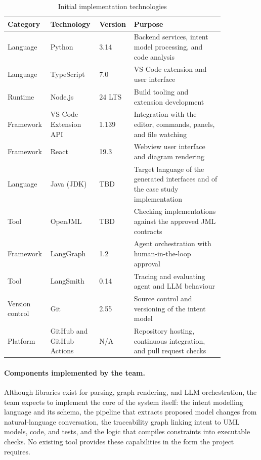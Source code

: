 \documentclass{article}
\begin{document}
\begin{table}[h]
  \centering
  \small
  \renewcommand{\arraystretch}{1.3}
  \begin{tabular}{|p{0.15\linewidth}|p{0.2\linewidth}|p{0.1\linewidth}|p{0.4\linewidth}|}
  \hline
  \textbf{Category} & \textbf{Technology} & \textbf{Version} & \textbf{Purpose} \\
  \hline
  Language & Python & 3.14 & Backend services, intent model processing, and code analysis \\
  \hline
  Language & TypeScript & 7.0 & VS Code extension and user interface \\
  \hline
  Runtime & Node.js & 24 LTS & Build tooling and extension development \\
  \hline
  Framework & VS Code Extension API & 1.139 & Integration with the editor, commands, panels, and file watching \\
  \hline
  Framework & React & 19.3 & Webview user interface and diagram rendering \\
  \hline
  Language & Java (JDK) & TBD & Target language of the generated interfaces and of the case study implementation \\
  \hline
  Tool & OpenJML & TBD & Checking implementations against the approved JML contracts \\
  \hline
  Framework & LangGraph & 1.2 & Agent orchestration with human-in-the-loop approval \\
  \hline
  Tool & LangSmith & 0.14 & Tracing and evaluating agent and LLM behaviour \\
  \hline
  Version control & Git & 2.55 & Source control and versioning of the intent model \\
  \hline
  Platform & GitHub and GitHub Actions & N/A & Repository hosting, continuous integration, and pull request checks \\
  \hline

\end{tabular}
\caption{Initial implementation technologies}
\label{tab:tech-stack}
\end{table}

\paragraph{Components implemented by the team.} Although libraries exist for parsing, 
graph rendering, and LLM orchestration, the team expects to implement the core of the 
system itself: the intent modelling language and its schema, the pipeline that extracts 
proposed model changes from natural-language conversation, the traceability graph 
linking intent to UML models, code, and tests, and the logic that compiles constraints 
into executable checks. No existing tool provides these capabilities in the form the 
project requires.
\end{document}
